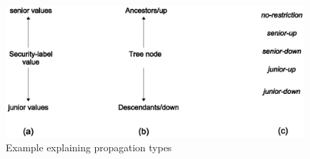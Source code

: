  
 	\begin{figure} [t]
 		\centering
 		\includegraphics[width=1\textwidth]{propagation-types}
 		\caption{Example explaining propagation types}
 		\label{fig:propagation-types}
 	\end{figure}
 